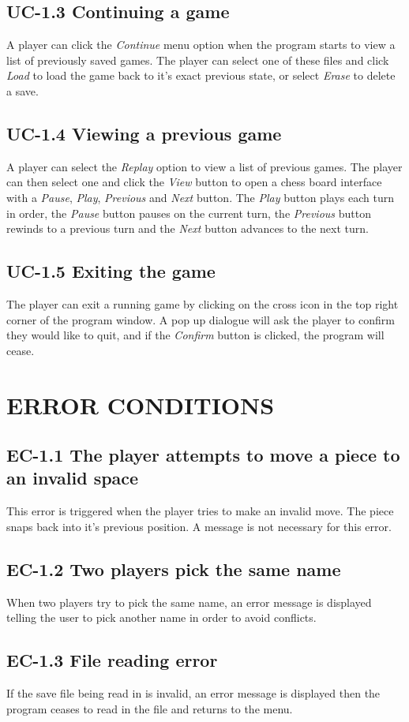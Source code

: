 \documentclass{project}
\begin{document}
\subsection{UC-1.3 Continuing a game}
A player can click the \emph{Continue} menu option when the program starts to view a list of previously saved games. The player can select one of these files and click \emph{Load} to load the game back to it's exact previous state, or select \emph{Erase} to delete a save.
\subsection{UC-1.4 Viewing a previous game}
A player can select the \emph{Replay} option to view a list of previous games. The player can then select one and click the \emph{View} button to open a chess board interface with a \emph{Pause}, \emph{Play}, \emph{Previous} and \emph{Next} button. The \emph{Play} button plays each turn in order, the \emph{Pause} button pauses on the current turn, the \emph{Previous} button rewinds to a previous turn and the \emph{Next} button advances to the next turn.
\subsection{UC-1.5 Exiting the game}
The player can exit a running game by clicking on the cross icon in the top right corner of the program window. A pop up dialogue will ask the player to confirm they would like to quit, and if the \emph{Confirm} button is clicked, the program will cease.
\section{ERROR CONDITIONS}
\subsection{EC-1.1 The player attempts to move a piece to an invalid space}
This error is triggered when the player tries to make an invalid move. The piece snaps back into it's previous position. A message is not necessary for this error.
\subsection{EC-1.2 Two players pick the same name}
When two players try to pick the same name, an error message is displayed telling the user to pick another name in order to avoid conflicts.
\subsection{EC-1.3 File reading error}
If the save file being read in is invalid, an error message is displayed then the program ceases to read in the file and returns to the menu.
\end{document}
